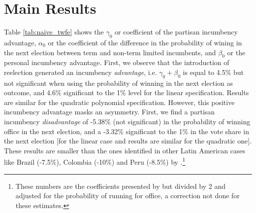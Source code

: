 \section{Main Results \label{sec:results}}

Table \ref{tab:naive_twfe} shows the $\gamma_0$ or coefficient of the partisan incumbency advantage, $\alpha_0$ or the coefficient of the difference in the probability of wining in the next election between term and non-term limited incumbents, and $\beta_0$ or the personal incumbency advantage. First, we observe that the introduction of reelection generated an incumbency \emph{advantage}, i.e. $\gamma_0 + \beta_0$ is equal to 4.5\% but not significant when using the probability of winning in the next election as outcome, and 4.6\% significant to the 1\% level for the linear specification. Results are similar for the quadratic polynomial specification. However, this positive incumbency advantage masks an asymmetry. First, we find a partisan incumbency \emph{disadvantage} of -5.38\% (not significant) in the probability of winning office in the next election, and a -3.32\% significant to the 1\% in the vote share in the next election [for the linear case and results are similar for the quadratic one]. These results are smaller than the ones identified in other Latin American cases like Brazil (-7.5\%), Colombia (-10\%) and Peru (-8.5\%) by \citet{klasnja_titiunik_2017}.\footnote{These numbers are the coefficients presented by \citet{klasnja_titiunik_2017} but divided by 2 and adjusted for the probability of running for office, a correction not done for these estimates.} 
 
\begin{table}[h]\def\sym#1{\ifmmode^{#1}\else\(^{#1}\)\fi}
\centering
\caption{Partisan and Personal Incumbency Advantage, Difference-in-Discontinuity of Close Elections Model}
\label{tab:naive_twfe}
\end{table}    


